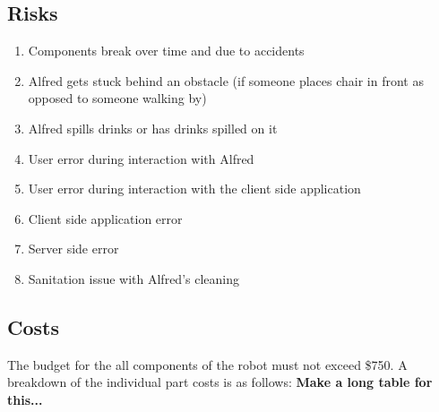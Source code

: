 \documentclass [11pt]{article}
\begin{document}
\subsection{Risks}
	\begin{enumerate}[label=\textbf{(\roman*)}]
		\item Components break over time and due to accidents
		\item Alfred gets stuck behind an obstacle (if someone places chair in front as opposed to someone walking by)
		\item Alfred spills drinks or has drinks spilled on it
		\item User error during interaction with Alfred
		\item User error during interaction with the client side application
		\item Client side application error
		\item Server side error
		\item Sanitation issue with Alfred's cleaning
	\end{enumerate}

\subsection{Costs}	
The budget for the all components of the robot must not exceed \$750. A breakdown of the individual part costs is as follows:
\textbf{Make a long table for this...}
%		


\end{document}
